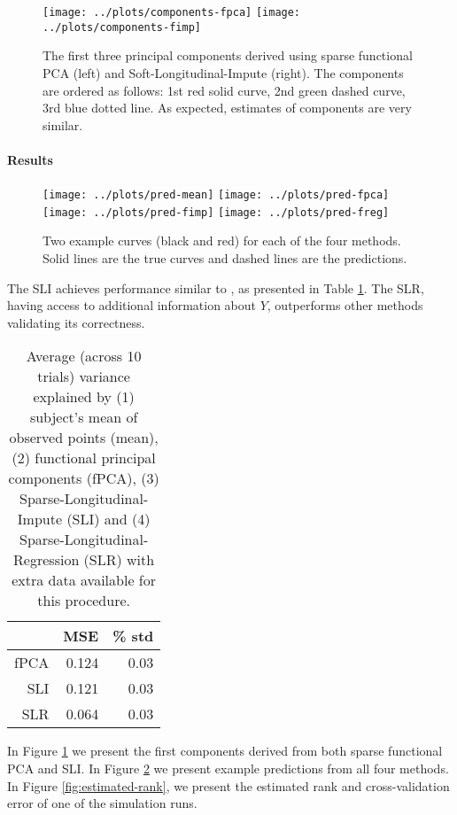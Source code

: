 \documentclass[preprint]{imsart}
\numberwithin{equation}{section}
\theoremstyle{plain}
\begin{document}
 \begin{figure}[h!]
  \texttt{[image: ../plots/components-fpca]}
  \texttt{[image: ../plots/components-fimp]}
  \caption{The first three principal components derived using sparse functional PCA (left) and Soft-Longitudinal-Impute (right). The components are ordered as follows: 1st red solid curve, 2nd green dashed curve, 3rd blue dotted line. As expected, estimates of components are very similar.}
  \label{fig:principal-components}
\end{figure}

\paragraph{Results}

\begin{figure}[h!]
  \texttt{[image: ../plots/pred-mean]}
  \texttt{[image: ../plots/pred-fpca]}
  \texttt{[image: ../plots/pred-fimp]}
  \texttt{[image: ../plots/pred-freg]}
  \caption{Two example curves (black and red) for each of the four methods. Solid lines are the true curves and dashed lines are the predictions. }
  \label{fig:example-predictions}
\end{figure}

The SLI achieves performance similar to \citep{james2000principal}, as presented in Table \ref{tbl:simulations}. The SLR, having access to additional information about $Y$, outperforms other methods validating its correctness.

\begin{table}[ht]
\centering
\begin{tabular}{rrr}
  \hline
 & MSE & \% std \\ 
  \hline
  fPCA & 0.124 & 0.03 \\ 
  SLI & 0.121 & 0.03 \\ 
  SLR & 0.064 & 0.03 \\ 
   \hline
\end{tabular}
\caption{Average (across 10 trials) variance explained by (1) subject's mean of observed points (mean), (2) functional principal components (fPCA), (3) Sparse-Longitudinal-Impute (SLI) and (4) Sparse-Longitudinal-Regression (SLR) with extra data available for this procedure.}
\label{tbl:simulations}
\end{table}

In Figure \ref{fig:principal-components} we present the first components derived from both sparse functional PCA and SLI. In Figure \ref{fig:example-predictions} we present example predictions from all four methods. In Figure \ref{fig:estimated-rank}, we present the estimated rank and cross-validation error of one of the simulation runs.
\end{document}
